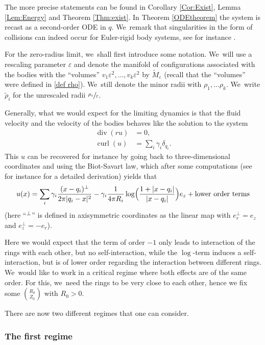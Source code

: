 \documentclass[10pt]{amsart}
\let\epsilon\varepsilon
\theoremstyle{definition}
\renewcommand{\div}{\operatorname{div}}
\DeclareMathOperator{\curl}{curl}
\let\eps\epsilon
\begin{document}
The more precise statements can be found in Corollary \ref{Cor:Exist}, Lemma \ref{Lem:Energy} and Theorem \ref{Thm:exist}.
In Theorem \ref{ODEtheorem} the system is recast as a second-order ODE in $q$. We~remark that singularities in the form of collisions can indeed occur for
Euler-rigid body systems, see for instance \cite{HouotMunnier4}.

For the zero-radius limit, we~shall first introduce some notation. We~will use a rescaling parameter $\eps$ and denote the manifold of configurations associated with the bodies with the ``volumes'' $v_1\eps^2,\dots, v_k\eps^2$ by $\tilde{M}_\eps$ (recall that the ``volumes'' were defined in \eqref{def rho}). We~still denote the minor radii with $\rho_1,\dots\rho_k$. We~write $\tilde{\rho}_i$ for the unrescaled radii $\sfrac{\rho_i}{\eps}$.

Generally, what we would expect for the limiting dynamics is that the fluid velocity and the velocity of the bodies behaves like the solution to the system
\begin{align*}
\div(ru)&=0,\\
\curl(u)&=\sum_i\gamma_i\delta_{q_i}.
\end{align*}
This $u$ can be recovered for instance by going back to three-dimensional coordinates and using the Biot-Savart law, which after some computations (see for instance \hbox{\cite[Lem.\,4]{ButtaMarchioro}} for a detailed derivation) yields that
\begin{equation}\label{asymptotic velocity}
u(x)=\sum_i\gamma_i\frac{(x-q_i)^\perp}{2\pi|q_i-x|^2}-\gamma_i\frac{1}{4\pi R_i}\log\Bigl(\frac{1+|x-q_i|}{|x-q_i|}\Bigr)e_z+\text{lower order terms}
\end{equation}
(here ``$\vphantom{a}^\perp$'' is defined in axisymmetric coordinates as the linear map with $e_r^\perp=e_z$ and $e_z^\perp=-e_r$).

Here we would expect that the term of order $-1$ only leads to interaction of the rings with each other, but no self-interaction, while the $\log$-term induces a self-interaction, but is of lower order regarding the interaction between different rings. We~would like to work in a critical regime where both effects are of the same order. For this, we~need the rings to be very close to each other, hence we fix some $\binom{R_0}{Z_0}$ with $R_0>0$.

There are now two different regimes that one can consider.

\subsubsection{The first regime}
\end{document}
